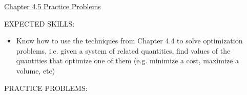 \documentclass[12pt]{article}
\begin{document}
\begin{center}
\underline{\LARGE{Chapter 4.5 Practice Problems}}
\end{center}

\noindent EXPECTED SKILLS:

\begin{itemize}

\item Know how to use the techniques from Chapter 4.4 to solve optimization problems, i.e. given a system of related quantities, find values of the quantities that optimize one of them (e.g. minimize a cost, maximize a volume, etc)

\end{itemize}

\noindent PRACTICE PROBLEMS:

\medskip
\end{document}

